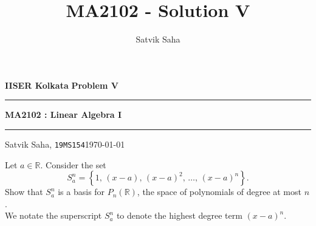 \documentclass[10pt]{article}
\title{MA2102 - Solution V}
\author{Satvik Saha}
\date{}
\begin{document}
        \par\textbf{IISER Kolkata} \hfill \textbf{Problem V}
        \vspace{3pt}
        \hrule
        \vspace{3pt}
        \begin{center}
                \LARGE{\textbf{MA2102 : Linear Algebra I}}
        \end{center}
        \vspace{3pt}
        \hrule
        \vspace{3pt}
        Satvik Saha, \texttt{19MS154}\hfill\today
        \vspace{20pt}

        Let $a \in \mathbb{R}$. Consider the set
        \[
                S_a^n = \left\{ 1,\, (x - a),\, (x - a)^2,\, \dots,\, (x - a)^n \right\}.
        \]
        Show that $S_a^n$ is a basis for $P_n(\mathbb{R})$, the space of polynomials of degree at most $n$. \\

        We notate the superscript $S_a^n$ to denote the highest degree term $(x - a)^n$.
\end{document}
